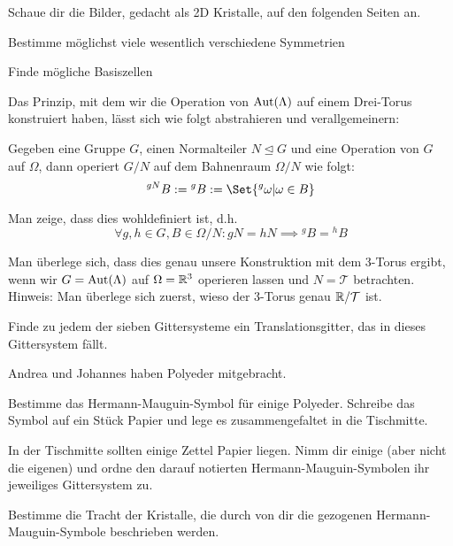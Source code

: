 \begin{sheet}

\begin{problem}
Schaue dir die Bilder, gedacht als 2D Kristalle, auf den folgenden Seiten an.
\begin{subproblem}
Bestimme möglichst viele wesentlich verschiedene Symmetrien
\end{subproblem}
\begin{subproblem}
Finde mögliche Basiszellen
\end{subproblem}
\end{problem}

\begin{problem}[difficulty={fortgeschritten}]
Das Prinzip, mit dem wir die Operation von $\operatorname{Aut}(\Lambda)$ auf einem Drei-Torus konstruiert haben, lässt sich wie folgt abstrahieren und verallgemeinern:

Gegeben eine Gruppe $G$, einen Normalteiler $N\unlhd G$ und eine Operation von $G$ auf $\Omega$, dann operiert $G/N$ auf dem Bahnenraum $\Omega/N$ wie folgt:
\[{^{gN} B} := {^g B} := \Set{{^g \omega} | \omega\in B}\]
\begin{subproblem}[difficulty={einfach}]
Man zeige, dass dies wohldefiniert ist, d.h.
\[\forall g,h\in G, B\in\Omega/N: gN=hN \implies {^g B} = {^h B}\]
\end{subproblem}
\begin{subproblem}[difficulty={mittel}]
Man überlege sich, dass dies genau unsere Konstruktion mit dem 3-Torus ergibt, wenn wir $G=\operatorname{Aut}(\Lambda)$ auf $\Omega=\mathbb{R}^3$ operieren lassen und $N=\mathcal{T}$ betrachten. Hinweis: Man überlege sich zuerst, wieso der 3-Torus genau $\mathbb{R} / \mathcal{T}$ ist.
\end{subproblem}
\end{problem}

\begin{problem}[difficulty={leicht bis mittel}]
Finde zu jedem der sieben Gittersysteme ein Translationsgitter, das in dieses Gittersystem fällt.
\end{problem}

\begin{problem}
	Andrea und Johannes haben Polyeder mitgebracht. 
	\begin{subproblem}
		Bestimme das Hermann-Mauguin-Symbol für einige Polyeder. Schreibe das Symbol auf ein Stück Papier und lege es zusammengefaltet in die Tischmitte.
	\end{subproblem}
	\begin{subproblem}
		In der Tischmitte sollten einige Zettel Papier liegen. Nimm dir einige (aber nicht die eigenen) und ordne den darauf notierten Hermann-Mauguin-Symbolen ihr jeweiliges Gittersystem zu.
	\end{subproblem}
	\begin{subproblem}[difficulty={mittel}]
		Bestimme die Tracht der Kristalle, die durch von dir die gezogenen Hermann-Mauguin-Symbole beschrieben werden.
	\end{subproblem}
	

\end{problem}
\end{sheet}
